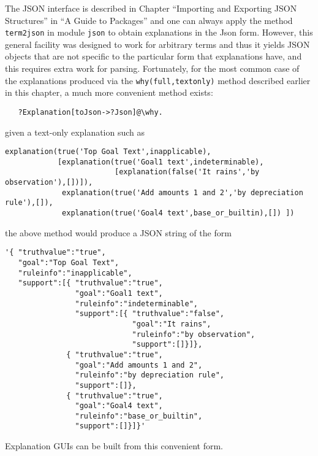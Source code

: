 The \FLSYSTEM JSON interface is described in Chapter ``Importing and
Exporting JSON Structures'' in ``A Guide to \FLSYSTEM Packages''
and one can always apply the method \texttt{term2json} in module
\texttt{\bs{}json} to obtain explanations in the Json form. However, this
general facility was designed to work for arbitrary \FLSYSTEM terms and
thus it yields JSON objects that are not specific to the particular form
that explanations have, and this requires extra work for parsing.
Fortunately, for the most common case of the explanations produced via the
\texttt{why(full,textonly)} method described earlier in this chapter, a
much more convenient method exists:
\begin{verbatim}
   ?Explanation[toJson->?Json]@\why.
\end{verbatim}
given a text-only explanation such as 
\begin{verbatim}
explanation(true('Top Goal Text',inapplicable),
            [explanation(true('Goal1 text',indeterminable),
                         [explanation(false('It rains','by observation'),[])]),
             explanation(true('Add amounts 1 and 2','by depreciation rule'),[]),
             explanation(true('Goal4 text',base_or_builtin),[]) ])
\end{verbatim}
the above method would produce a JSON string of the form
\begin{verbatim}
'{ "truthvalue":"true",
   "goal":"Top Goal Text",
   "ruleinfo":"inapplicable",
   "support":[{ "truthvalue":"true",
                "goal":"Goal1 text",
                "ruleinfo":"indeterminable",
                "support":[{ "truthvalue":"false",
                             "goal":"It rains",
                             "ruleinfo":"by observation",
                             "support":[]}]},
              { "truthvalue":"true",
                "goal":"Add amounts 1 and 2",
                "ruleinfo":"by depreciation rule",
                "support":[]},
              { "truthvalue":"true",
                "goal":"Goal4 text",
                "ruleinfo":"base_or_builtin",
                "support":[]}]}'
\end{verbatim}
Explanation GUIs can be built from this convenient form.




